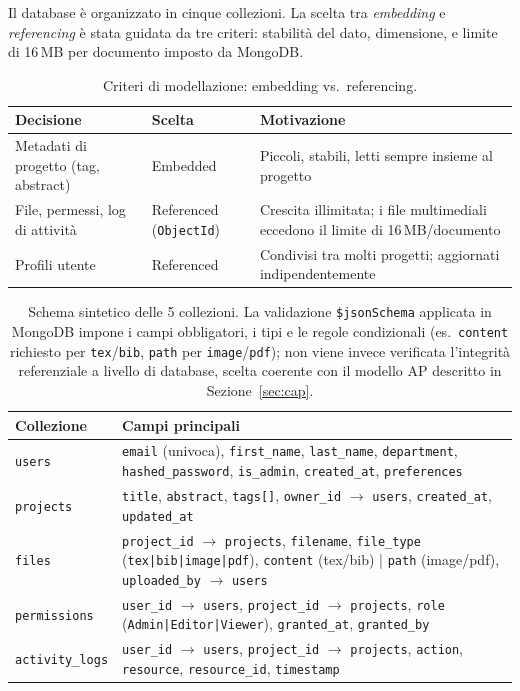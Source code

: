 \documentclass[11pt,a4paper]{article}
\begin{document}
Il database è organizzato in cinque collezioni. La scelta tra \emph{embedding} e \emph{referencing} è stata guidata da tre criteri: stabilità del dato, dimensione, e limite di 16\,MB per documento imposto da MongoDB.

\begin{table}[h!]
\centering
\begin{tabular}{@{}p{4.2cm}p{2.2cm}p{7cm}@{}}
\toprule
\textbf{Decisione} & \textbf{Scelta} & \textbf{Motivazione} \\
\midrule
Metadati di progetto (tag, abstract) & Embedded & Piccoli, stabili, letti sempre insieme al progetto \\
File, permessi, log di attività & Referenced (\texttt{ObjectId}) & Crescita illimitata; i file multimediali eccedono il limite di 16\,MB/documento \\
Profili utente & Referenced & Condivisi tra molti progetti; aggiornati indipendentemente \\
\bottomrule
\end{tabular}
\caption{Criteri di modellazione: embedding vs.\ referencing.}
\end{table}

\begin{table}[h!]
\centering
\small
\begin{tabular}{@{}p{2.2cm}p{9.8cm}@{}}
\toprule
\textbf{Collezione} & \textbf{Campi principali} \\
\midrule
\texttt{users} & \texttt{email} (univoca), \texttt{first\_name}, \texttt{last\_name}, \texttt{department}, \texttt{hashed\_password}, \texttt{is\_admin}, \texttt{created\_at}, \texttt{preferences} \\
\texttt{projects} & \texttt{title}, \texttt{abstract}, \texttt{tags[]}, \texttt{owner\_id} $\to$ \texttt{users}, \texttt{created\_at}, \texttt{updated\_at} \\
\texttt{files} & \texttt{project\_id} $\to$ \texttt{projects}, \texttt{filename}, \texttt{file\_type} (\texttt{tex|bib|image|pdf}), \texttt{content} (tex/bib) | \texttt{path} (image/pdf), \texttt{uploaded\_by} $\to$ \texttt{users} \\
\texttt{permissions} & \texttt{user\_id} $\to$ \texttt{users}, \texttt{project\_id} $\to$ \texttt{projects}, \texttt{role} (\texttt{Admin|Editor|Viewer}), \texttt{granted\_at}, \texttt{granted\_by} \\
\texttt{activity\_logs} & \texttt{user\_id} $\to$ \texttt{users}, \texttt{project\_id} $\to$ \texttt{projects}, \texttt{action}, \texttt{resource}, \texttt{resource\_id}, \texttt{timestamp} \\
\bottomrule
\end{tabular}
\caption{Schema sintetico delle 5 collezioni. La validazione \texttt{\$jsonSchema} applicata in MongoDB impone i campi obbligatori, i tipi e le regole condizionali (es.\ \texttt{content} richiesto per \texttt{tex}/\texttt{bib}, \texttt{path} per \texttt{image}/\texttt{pdf}); non viene invece verificata l'integrità referenziale a livello di database, scelta coerente con il modello AP descritto in Sezione~\ref{sec:cap}.}
\end{table}
\end{document}
